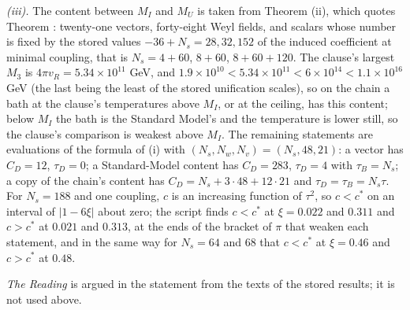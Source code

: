 \emph{(iii).} The content between $M_{I}$ and $M_{U}$ is taken from Theorem (ii), which quotes Theorem : twenty-one vectors, forty-eight Weyl fields, and scalars whose number is fixed by the stored values $-36 + N_{s} = 28, 32, 152$ of the induced coefficient at minimal coupling, that is $N_{s} = 4 + 60$, $8 + 60$, $8 + 60 + 120$. The clause's largest $M_{3}$ is $4\pi v_{R} = 5.34 \times 10^{11}$ GeV, and $1.9 \times 10^{10} < 5.34 \times 10^{11} < 6 \times 10^{14} < 1.1 \times 10^{16}$ GeV (the last being the least of the stored unification scales), so on the chain a bath at the clause's temperatures above $M_{I}$, or at the ceiling, has this content; below $M_{I}$ the bath is the Standard Model's and the temperature is lower still, so the clause's comparison is weakest above $M_{I}$. The remaining statements are evaluations of the formula of (i) with $(N_{s}, N_{w}, N_{v}) = (N_{s}, 48, 21)$: a vector has $C_{D} = 12$, $\tau_{D} = 0$; a Standard-Model content has $C_{D} = 283$, $\tau_{D} = 4$ with $\tau_{B} = N_{s}$; a copy of the chain's content has $C_{D} = N_{s} + 3 \cdot 48 + 12 \cdot 21$ and $\tau_{D} = \tau_{B} = N_{s}\tau$. For $N_{s} = 188$ and one coupling, $c$ is an increasing function of $\tau^{2}$, so $c < c^{*}$ on an interval of $|1 - 6\xi|$ about zero; the script finds $c < c^{*}$ at $\xi = 0.022$ and $0.311$ and $c > c^{*}$ at $0.021$ and $0.313$, at the ends of the bracket of $\pi$ that weaken each statement, and in the same way for $N_{s} = 64$ and $68$ that $c < c^{*}$ at $\xi = 0.46$ and $c > c^{*}$ at $0.48$.

\emph{The Reading} is argued in the statement from the texts of the stored results; it is not used above.
